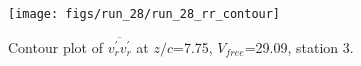 \begin{figure}[H]
\centering
\texttt{[image: figs/run\_28/run\_28\_rr\_contour]}
\caption{Contour plot of $\overline{v_{r}^{\prime} v_{r}^{\prime}}$ at $z/c$=7.75, $V_{free}$=29.09, station 3.}
\label{fig:run_28_rr_contour}
\end{figure}


